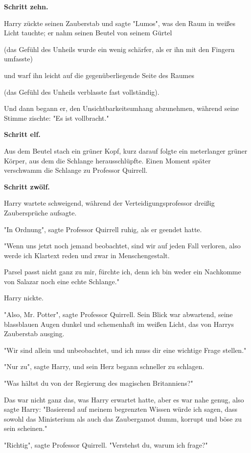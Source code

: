 {\textbf{Schritt zehn.}

Harry zückte seinen Zauberstab und sagte "Lumos", was den Raum in weißes Licht tauchte; er nahm seinen Beutel von seinem Gürtel

(das Gefühl des Unheils wurde ein wenig schärfer, als er ihn mit den Fingern umfasste)

und warf ihn leicht auf die gegenüberliegende Seite des Raumes

(das Gefühl des Unheils verblasste fast vollständig).

Und dann begann er, den Unsichtbarkeitsumhang abzunehmen, während seine Stimme zischte: "Es ist vollbracht."

\textbf{Schritt elf.}

Aus dem Beutel stach ein grüner Kopf, kurz darauf folgte ein meterlanger grüner Körper, aus dem die Schlange herausschlüpfte. Einen Moment später verschwamm die Schlange zu Professor Quirrell.

\textbf{Schritt zwölf.}

Harry wartete schweigend, während der Verteidigungsprofessor dreißig Zaubersprüche aufsagte.

"In Ordnung", sagte Professor Quirrell ruhig, als er geendet hatte.

"Wenn uns jetzt noch jemand beobachtet, sind wir auf jeden Fall verloren, also werde ich Klartext reden und zwar in Menschengestalt.

Parsel passt nicht ganz zu mir, fürchte ich, denn ich bin weder ein Nachkomme von Salazar noch eine echte Schlange."

Harry nickte.

"Also, Mr. Potter", sagte Professor Quirrell. Sein Blick war abwartend, seine blassblauen Augen dunkel und schemenhaft im weißen Licht, das von Harrys Zauberstab ausging.

"Wir sind allein und unbeobachtet, und ich muss dir eine wichtige Frage stellen."

"Nur zu", sagte Harry, und sein Herz begann schneller zu schlagen.

"Was hältst du von der Regierung des magischen Britanniens?"

Das war nicht ganz das, was Harry erwartet hatte, aber es war nahe genug, also sagte Harry: "Basierend auf meinem begrenzten Wissen würde ich sagen, dass sowohl das Ministerium als auch das Zaubergamot dumm, korrupt und böse zu sein scheinen."

"Richtig", sagte Professor Quirrell. "Verstehst du, warum ich frage?"

}

